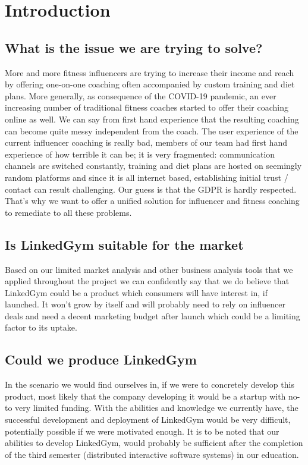 \section{Introduction}

\subsection{What is the issue we are trying to solve?}
More and more fitness influencers are trying to increase their income and reach by offering one-on-one coaching often accompanied by custom training and diet plans. More generally, as consequence of the COVID-19 pandemic, an ever increasing number of traditional fitness coaches started to offer their coaching online as well.
We can say from first hand experience that the resulting coaching can become quite messy independent from the coach.
The user experience of the current influencer coaching is really bad, members of our team had first hand experience of how terrible it can be; it is very fragmented: communication channels are switched constantly, training and diet plans are hosted on seemingly random platforms and since it is all internet based, establishing initial trust / contact can result challenging. Our guess is that the GDPR is hardly respected.
That's why we want to offer a unified solution for influencer and fitness coaching to remediate to all these problems.

\subsection{Is LinkedGym suitable for the market}

Based on our limited market analysis and other business analysis tools that we applied throughout the project we can confidently say that we do believe that LinkedGym could be a product which consumers will have interest in, if launched. It won't grow by itself and will probably need to rely on influencer deals and need a decent marketing budget after launch which could be a limiting factor to its uptake.

\subsection{Could we produce LinkedGym}
In the scenario we would find ourselves in, if we were to concretely develop this product, most likely that the company developing it would be a startup with no- to very limited funding. With the abilities and knowledge we currently have, the successful development and deployment of LinkedGym would be very difficult, potentially possible if we were motivated enough. It is to be noted that our abilities to develop LinkedGym, would probably be sufficient after the completion of the third semester (distributed interactive software systems) in our education.

